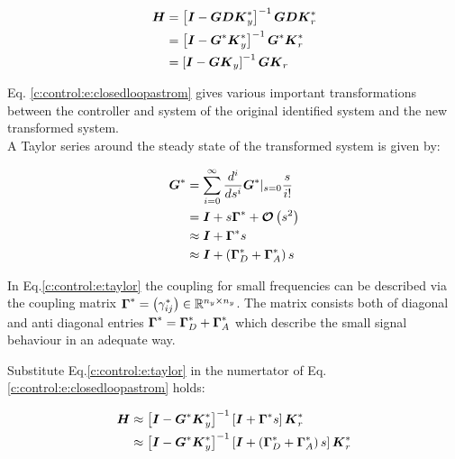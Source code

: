 \begin{align}
\begin{split}
\mbox{\boldmath$H$} &= \left[ \mbox{\boldmath$I$}  - \mbox{\boldmath$G$} \mbox{\boldmath$D$} \mbox{\boldmath$K$}_y^* \right]^{-1} \mbox{\boldmath$G$} \mbox{\boldmath$D$} \mbox{\boldmath$K$}_r^* \\
	 &= \left[ \mbox{\boldmath$I$}  - \mbox{\boldmath$G$}^* \mbox{\boldmath$K$}_y^* \right]^{-1} \mbox{\boldmath$G$}^* \mbox{\boldmath$K$}_r^* \\
     &= \left[ \mbox{\boldmath$I$}  - \mbox{\boldmath$G$} \mbox{\boldmath$K$}_y \right]^{-1} \mbox{\boldmath$G$} \mbox{\boldmath$K$}_r \\
\end{split}
\label{c:control:e:closedloopastrom}
\end{align}

Eq. \ref{c:control:e:closedloopastrom} gives various important transformations between the controller and system of the original identified system and the new transformed system. \\ 

A Taylor series around the steady state of the  transformed system is given by:

\begin{align}
\begin{split}
\mbox{\boldmath$G$}^* &= \sum_{i=0}^\infty \frac{d^i}{ds^i} \mbox{\boldmath$G$}^* |_{s=0} \frac{s}{i!} \\
&= \mbox{\boldmath$I$} + s \mbox{\boldmath$\Gamma$}^* + \mbox{\boldmath$\mathcal{O}$}\left(s^2\right) \\
&\approx \mbox{\boldmath$I$} +  \mbox{\boldmath$\Gamma$}^* s \\
&\approx \mbox{\boldmath$I$} + \left( \mbox{\boldmath$\Gamma$}^*_D + \mbox{\boldmath$\Gamma$}^*_A \right) s
\end{split}
\label{c:control:e:taylor}
\end{align}

In Eq.\ref{c:control:e:taylor} the coupling for small frequencies can be described via the coupling matrix $\mbox{\boldmath$\Gamma$}^* = \left( \gamma_{ij}^* \right)\in \mathbb{R}^{n_y \times n_y}$. The matrix consists both of diagonal and anti diagonal entries $\mbox{\boldmath$\Gamma$}^* = \mbox{\boldmath$\Gamma$}^*_D + \mbox{\boldmath$\Gamma$}^*_A$ which describe the small signal behaviour in an adequate way. \newline

Substitute Eq.\ref{c:control:e:taylor} in the numertator of Eq. \ref{c:control:e:closedloopastrom} holds:

\begin{align}
\begin{split}
\mbox{\boldmath$H$} &\approx \left[ \mbox{\boldmath$I$}  - \mbox{\boldmath$G$}^* \mbox{\boldmath$K$}_y^* \right]^{-1} \left[ \mbox{\boldmath$I$} +  \mbox{\boldmath$\Gamma$}^* s \right] \mbox{\boldmath$K$}_r^* \\
  &\approx \left[ \mbox{\boldmath$I$}  - \mbox{\boldmath$G$}^* \mbox{\boldmath$K$}_y^* \right]^{-1} \left[ \mbox{\boldmath$I$} + \left( \mbox{\boldmath$\Gamma$}^*_D + \mbox{\boldmath$\Gamma$}^*_A \right) s\right] \mbox{\boldmath$K$}_r^* \\
\end{split}
\end{align}

